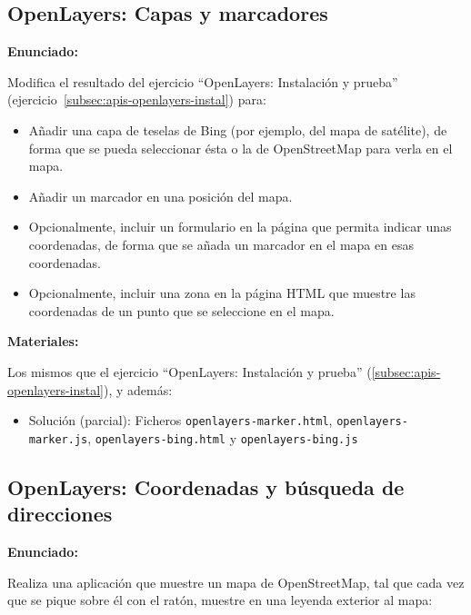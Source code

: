 \subsection{OpenLayers: Capas y marcadores}
\label{subsec:apis-openlayers-capas}

\textbf{Enunciado:}

Modifica el resultado del ejercicio ``OpenLayers: Instalación y prueba'' (ejercicio~\ref{subsec:apis-openlayers-instal}) para:

\begin{itemize}
\item Añadir una capa de teselas de Bing (por ejemplo, del mapa de satélite), de forma que se pueda seleccionar ésta o la de OpenStreetMap para verla en el mapa.
\item Añadir un marcador en una posición del mapa.
\item Opcionalmente, incluir un formulario en la página que permita indicar unas coordenadas, de forma que se añada un marcador en el mapa en esas coordenadas.
\item Opcionalmente, incluir una zona en la página HTML que muestre las coordenadas de un punto que se seleccione en el mapa.
\end{itemize}

\textbf{Materiales:}

Los mismos que el ejercicio ``OpenLayers: Instalación y prueba'' (\ref{subsec:apis-openlayers-instal}), y además:

\begin{itemize}
\item Solución (parcial): Ficheros \verb|openlayers-marker.html|, \verb|openlayers-marker.js|, \verb|openlayers-bing.html| y \verb|openlayers-bing.js|
\end{itemize}

\subsection{OpenLayers: Coordenadas y búsqueda de direcciones}
\label{subsec:apis-openlayers-coordenadas}

\textbf{Enunciado:}

Realiza una aplicación que muestre un mapa de OpenStreetMap, tal que cada vez que se pique sobre él con el ratón, muestre en una leyenda exterior al mapa:

